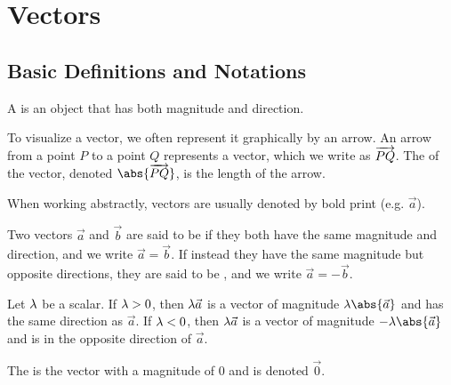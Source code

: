 \chapter{Vectors}

\section{Basic Definitions and Notations}

\begin{definition}
    A  is an object that has both magnitude and direction.
\end{definition}

To visualize a vector, we often represent it graphically by an arrow. An arrow from a point $P$ to a point $Q$ represents a vector, which we write as $\overrightarrow{PQ}$. The  of the vector, denoted $\abs{\oa{PQ}}$, is the length of the arrow.

When working abstractly, vectors are usually denoted by bold print (e.g. $\vec a$).

\begin{definition}
    Two vectors $\vec a$ and $\vec b$ are said to be  if they both have the same magnitude and direction, and we write $\vec a = \vec b$. If instead they have the same magnitude but opposite directions, they are said to be , and we write $\vec a = -\vec b$.
\end{definition}

\begin{definition}
    Let $\lambda$ be a scalar. If $\lambda > 0$, then $\lambda \vec a$ is a vector of magnitude $\l \abs{\vec a}$ and has the same direction as $\vec a$. If $\lambda < 0$, then $\lambda \vec a$ is a vector of magnitude $-\l \abs{\vec a}$ and is in the opposite direction of $\vec a$.
\end{definition}

 \begin{figure}[H]
    \centering
    \caption{}
\end{figure}

\begin{definition}
    The  is the vector with a magnitude of 0 and is denoted $\vec 0$.
\end{definition}

